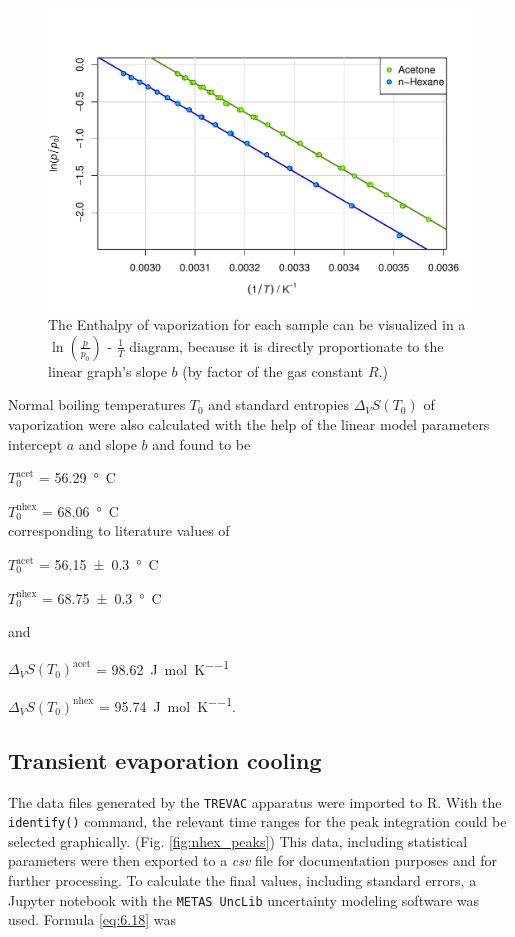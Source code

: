  
\begin{figure}[H]
    \centering
    \includegraphics[width=.5\textwidth]{figures/DDR1_inv_ln.pdf}
    \caption{The Enthalpy of vaporization for each sample can be visualized in a $\ln\left(\frac{p}{p_0}\right)$ - $\frac{1}{T}$ diagram, because it is directly proportionate to the linear graph's slope $b$ (by factor of the gas constant $R$.)}
    \label{fig:ddr1_inv_ln}
\end{figure}


Normal boiling temperatures $T_0$ and standard entropies $\Delta_VS(T_0)$ of vaporization were also calculated with the help of the linear model parameters intercept $a$ and slope $b$ and found to be 

$T_0^{\text{acet}}$ = \qty{56.29}{°C}  

$T_0^{\text{nhex}}$ = \qty{68.06}{°C}
\\corresponding to literature values of 

$T_0^{\text{acet}}$ = \qty{56.15 \pm 0.3}{°C} 

$T_0^{\text{nhex}}$ = \qty{68.75 \pm 0.3}{°C}

and

$\Delta_VS(T_0)^{\text{acet}}$ = \qty{98.62}{\joule\per\mole\per\kelvin}

$\Delta_VS(T_0)^{\text{nhex}}$ = \qty{95.74}{\joule\per\mole\per\kelvin}.





\subsection{Transient evaporation cooling}
The data files generated by the \texttt{TREVAC} apparatus were imported to R. With the \texttt{identify()} command, the relevant time ranges for the peak integration could be selected graphically. (Fig. \ref{fig:nhex_peaks}) This data, including statistical parameters were then exported to a \textit{csv} file for documentation purposes and for further processing. To calculate the final values, including standard errors, a Jupyter notebook \cite{IPython:2007} with the \texttt{METAS UncLib} uncertainty modeling software \cite{unclib} was used. Formula \ref{eq:6.18} was 

